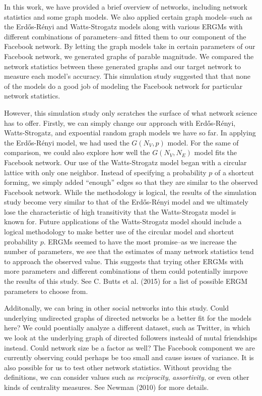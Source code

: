 \documentclass[12pt,twoside]{amherstthesis}
\begin{document}
  \setcounter{chapter}{4} \setcounter{section}{0}
  
  In this work, we have provided a brief overview of networks, including
  network statistics and some graph models. We also applied certain graph
  models--such as the Erdős-Rényi and Watts-Strogatz models along with
  various ERGMs with different combinations of parameters--and fitted them
  to our component of the Facebook network. By letting the graph models
  take in certain parameters of our Facebook network, we generated graphs
  of parable magnitude. We compared the network statistics between these
  generated graphs and our target network to measure each model's
  accuracy. This simulation study suggested that that none of the models
  do a good job of modeling the Facebook network for particular network
  statistics.
  
  However, this simulation study only scratches the surface of what
  network science has to offer. Firstly, we can simply change our approach
  with Erdős-Rényi, Watts-Strogatz, and expoential random graph models we
  have so far. In applying the Erdős-Rényi model, we had used the
  \(G(N_{V}, p)\) model. For the same of comparison, we could also explore
  how well the \(G(N_{V}, N_{E})\) model fits the Facebook network. Our
  use of the Watts-Strogatz model began with a circular lattice with only
  one neighbor. Instead of specifying a probability \(p\) of a shortcut
  forming, we simply added ``enough'' edges so that they are similar to
  the observed Facebook network. While the methodology is logical, the
  results of the simulation study become very similar to that of the
  Erdős-Rényi model and we ultimately lose the characteristic of high
  transitivity that the Watts-Strogatz model is known for. Future
  applications of the Watts-Strogatz model should include a logical
  methodology to make better use of the circular model and shortcut
  probability \(p\). ERGMs seemed to have the most promise--as we increase
  the number of parameters, we see that the estimates of many network
  statistics tend to approach the observed value. This suggests that
  trying other ERGMs with more parameters and different combinations of
  them could potentially imrpove the results of this study. See C. Butts
  et al. (2015) for a list of possible ERGM parameters to choose from.
  
  Additonally, we can bring in other social networks into this study.
  Could underlying undirected graphs of directed networks be a better fit
  for the models here? We could poentially analyze a different dataset,
  such as Twitter, in which we look at the underlying graph of directed
  followers insteald of mutal friendships instead. Could network size be a
  factor as well? The Facebook component we are currently observing could
  perhaps be too small and cause issues of variance. It is also possible
  for us to test other network statistics. Without providng the
  definitions, we can consider values such as \emph{reciprocity},
  \emph{assortivity}, or even other kinds of centrality measures. See
  Newman (2010) for more details.
  
\end{document}
